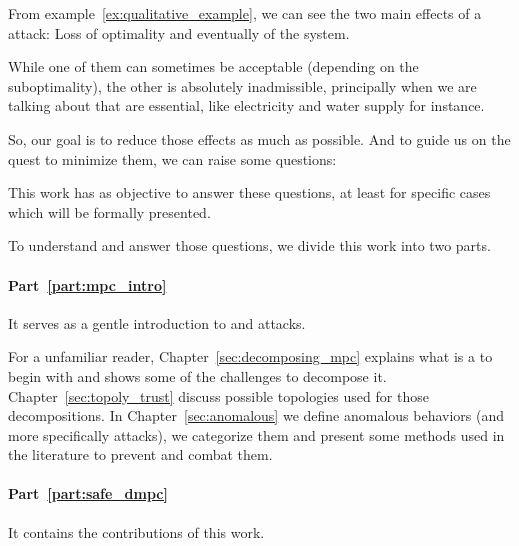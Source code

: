 \documentclass[../main.tex]{subfiles}
\begin{document}
From example~\ref{ex:qualitative_example}, we can see the two main effects of a attack: Loss of optimality and eventually  of the system.

While one of them can sometimes be acceptable (depending on the suboptimality), the other is absolutely inadmissible, principally when we are talking about \cps{} that are essential, like electricity and water supply for instance.

So, our goal is to reduce those effects as much as possible.
And to guide us on the quest to minimize them, we can raise some questions:

This work has as objective to answer these questions, at least for specific cases which will be formally presented.

To understand and answer those questions, we divide this work into two parts.

\paragraph{Part~\ref{part:mpc_intro}} It serves as a gentle introduction to \dmpc{} and attacks.

For a unfamiliar reader, Chapter~\ref{sec:decomposing_mpc} explains what is a \mpc{} to begin with and shows some of the challenges to decompose it.
Chapter~\ref{sec:topoly_trust} discuss possible topologies used for those decompositions.
In Chapter~\ref{sec:anomalous} we define anomalous behaviors (and more specifically attacks), we categorize them and present some methods used in the literature to prevent and combat them.

\paragraph{Part~\ref{part:safe_dmpc}} It contains the contributions of this work.
\end{document}
